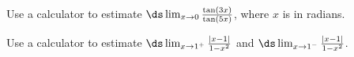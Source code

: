 \begin{multicols}{2}
\begin{enumialphparenastyle}
\begin{ex}
Use a calculator to estimate $\ds\lim_{x\to 0}
\frac{\tan(3x)}{\tan(5x)}$, where $x$ is in radians.
\end{ex}

\begin{ex}
Use a calculator to estimate $\ds\lim_{x\to 1^{+}}\frac{|x-1|}{1-x^2}$ and $\ds\lim_{x\to 1^{-}}\frac{|x-1|}{1-x^2}$.
\end{ex}

\end{enumialphparenastyle}

\end{multicols}